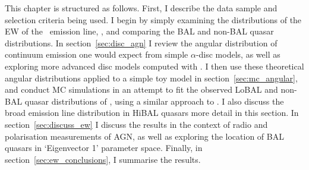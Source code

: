 This chapter is structured as follows. First, I describe
the data sample and selection criteria being used. I begin by
simply examining the distributions of the EW of the \oiiifull\ emission line,
\ewo, and comparing the BAL and non-BAL quasar distributions. 
In section~\ref{sec:disc_agn} I review the angular distribution of 
continuum emission one would expect from simple $\alpha$-disc models, 
as well as exploring more advanced disc models computed
with \agn. I then use these theoretical 
angular distributions applied to a simple toy model in 
section~\ref{sec:mc_angular},
and conduct MC simulations in an attempt to fit the observed LoBAL and non-BAL
quasar distributions of \ewo, using a similar approach to 
\cite{risaliti2011}. I also discuss the broad emission
line distribution in HiBAL quasars more detail in this section. 
In section~\ref{sec:discuss_ew} I discuss the results
in the context of radio and polarisation measurements of AGN, as well
as exploring the location of BAL quasars in `Eigenvector 1' parameter space.
Finally, in section~\ref{sec:ew_conclusions}, I summarise the results.



